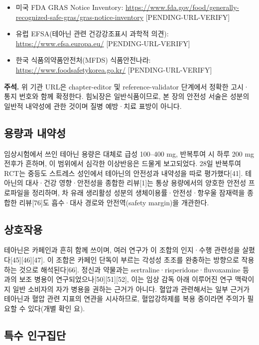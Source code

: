 \documentclass[12pt,oneside]{book}
\newenvironment{authnote}
  {\par\smallskip\begingroup\leftskip=6mm\rightskip=3mm\small\color{muted}\noindent\ignorespaces}
  {\par\endgroup\smallskip}
\begin{document}
\begin{itemize}[leftmargin=6mm,itemsep=1pt,topsep=2pt]
  \item 미국 FDA GRAS Notice Inventory: \url{https://www.fda.gov/food/generally-recognized-safe-gras/gras-notice-inventory} [PENDING-URL-VERIFY]
  \item 유럽 EFSA(테아닌 관련 건강강조표시 과학적 의견): \url{https://www.efsa.europa.eu/} [PENDING-URL-VERIFY]
  \item 한국 식품의약품안전처(MFDS) 식품안전나라: \url{https://www.foodsafetykorea.go.kr/} [PENDING-URL-VERIFY]
\end{itemize}

\begin{authnote}\textbf{주석.} 위 기관 URL은 chapter-editor 및 reference-validator 단계에서 정확한 고시·통지 번호와 함께 확정한다. 힘뇌장은 일반식품이므로, 본 장의 안전성 서술은 성분의 일반적 내약성에 관한 것이며 질병 예방·치료 표방이 아니다.\end{authnote}

\subsection{용량과 내약성}

임상시험에서 쓰인 테아닌 용량은 대체로 급성 100–400 mg, 반복투여 시 하루 200 mg 전후가 흔하며, 이 범위에서 심각한 이상반응은 드물게 보고되었다. 28일 반복투여 RCT는 중등도 스트레스 성인에서 테아닌의 안전성과 내약성을 따로 평가했다[41]. 테아닌의 대사·건강 영향·안전성을 종합한 리뷰[1]는 통상 용량에서의 양호한 안전성 프로파일을 정리하며, 차 유래 생리활성 성분의 생체이용률·안전성·항우울 잠재력을 종합한 리뷰[76]도 흡수·대사 경로와 안전역(safety margin)을 개관한다.

\subsection{상호작용}

테아닌은 카페인과 흔히 함께 쓰이며, 여러 연구가 이 조합의 인지·수행 관련성을 살폈다[45][46][47]. 이 조합은 카페인 단독이 부르는 각성성 초조를 완충하는 방향으로 작용하는 것으로 해석된다[66]. 정신과 약물과는 sertraline·risperidone·fluvoxamine 등과의 보조 병용이 연구되었으나[50][51][52], 이는 임상 감독 아래 이루어진 연구 맥락이지 일반 소비자의 자가 병용을 권하는 근거가 아니다. 혈압과 관련해서는 일부 근거가 테아닌과 혈압 관련 지표의 연관을 시사하므로, 혈압강하제를 복용 중이라면 주의가 필요할 수 있다(개별 확인 요).

\subsection{특수 인구집단}
\end{document}

